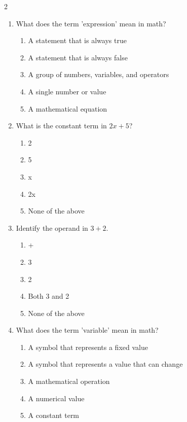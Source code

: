 \documentclass[10pt]{article}
\begin{document}
\begin{multicols}{2}
\begin{enumerate}[label=\textbf{Q\arabic*.}, leftmargin=*, itemsep=6pt, parsep=0pt]
  \item \small What does the term 'expression' mean in math?
  \begin{enumerate}[label=(\Alph*), leftmargin=0.6cm, nosep, itemsep=2pt]
    \item A statement that is always true
    \item A statement that is always false
    \item A group of numbers, variables, and operators
    \item A single number or value
    \item A mathematical equation
  \end{enumerate}

  \item \small What is the constant term in $2x + 5$?
  \begin{enumerate}[label=(\Alph*), leftmargin=0.6cm, nosep, itemsep=2pt]
    \item 2
    \item 5
    \item x
    \item 2x
    \item None of the above
  \end{enumerate}

  \item \small Identify the operand in $3 + 2$.
  \begin{enumerate}[label=(\Alph*), leftmargin=0.6cm, nosep, itemsep=2pt]
    \item +
    \item 3
    \item 2
    \item Both 3 and 2
    \item None of the above
  \end{enumerate}

  \item \small What does the term 'variable' mean in math?
  \begin{enumerate}[label=(\Alph*), leftmargin=0.6cm, nosep, itemsep=2pt]
    \item A symbol that represents a fixed value
    \item A symbol that represents a value that can change
    \item A mathematical operation
    \item A numerical value
    \item A constant term
  \end{enumerate}


\end{enumerate}
\end{multicols}
\end{document}
